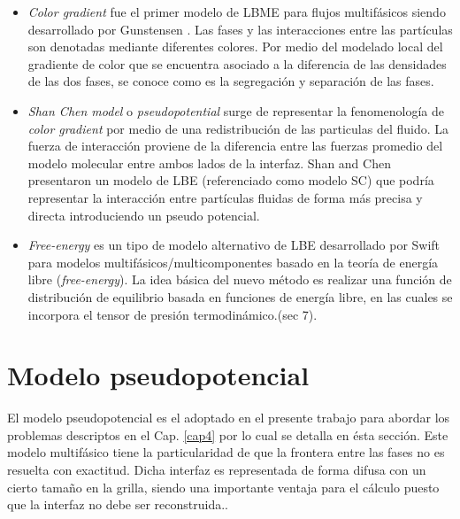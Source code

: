 \begin{itemize}
	
	\item \textit{Color gradient} fue el primer modelo de LBME para flujos multifásicos siendo desarrollado por Gunstensen \cite{gunstensen1991lattice}. Las fases y las interacciones entre las partículas son denotadas mediante diferentes colores. Por medio del modelado local del gradiente de color que se encuentra asociado a la diferencia de las densidades de las dos fases, se conoce como es la segregación y separación de las fases.
	
	\item \textit{Shan Chen model} o \textit{pseudopotential} surge de representar la fenomenología de \textit{color gradient} por medio de una redistribución de las particulas del fluido. La fuerza de interacción proviene de la diferencia entre las fuerzas promedio del modelo molecular  entre ambos lados de la interfaz. Shan and Chen \cite{shan1993lattice} presentaron un modelo de LBE (referenciado como modelo SC) que podría representar la interacción entre partículas fluidas de forma más precisa y directa introduciendo un pseudo potencial. 
	
	\item \textit{Free-energy} es un tipo de modelo alternativo de LBE desarrollado por Swift \cite{swift1995lattice} para modelos multifásicos/multicomponentes basado en la teoría de energía libre (\textit{free-energy}). La idea básica del nuevo método es realizar una función de distribución de equilibrio basada en funciones de energía libre, en las cuales se incorpora el tensor de presión termodinámico.\cite{guo2013lattice}(sec 7).
	

	
\end{itemize}




\section{Modelo pseudopotencial}

El modelo pseudopotencial es el adoptado en el presente trabajo para abordar los problemas descriptos en el Cap. \ref{cap4} por lo cual se detalla en ésta sección. Este modelo multifásico tiene la particularidad de que la frontera entre las fases no es resuelta con exactitud. Dicha interfaz es representada de forma difusa con un cierto tamaño en la grilla, siendo una importante ventaja para el cálculo puesto que la interfaz no debe ser reconstruida.\cite{parrill2019reviews}.


